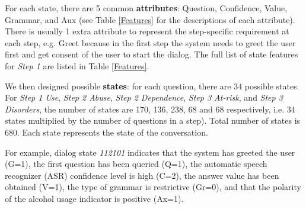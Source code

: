 \begin{sloppy}
For each state, there are 5 common {\bf attributes}: Question, Confidence, Value, Grammar, and Aux (see Table \ref{Features} for the descriptions of each attribute). There is usually 1 extra attribute to represent the step-specific requirement at each step, e.g. Greet because in the first step the system needs to greet the user first and get consent of the user to start the dialog. The full list of state features for {\em Step 1} are listed in Table \ref{Features}. 

We then designed possible {\bf states}: for each question, there are 34 possible states. 
For {\em Step 1 Use}, {\em Step 2 Abuse}, {\em Step 2 Dependence}, {\em Step 3 At-risk}, and {\em Step 3 Disorders}, the number of states are 170, 136, 238, 68 and 68 respectively, i.e. 34 states multiplied by the number of questions in a step). Total number of states is 680.
Each state represents the state of the conversation. 

For example, dialog state \textit{112101} indicates that the system has greeted the user (G=1), the first question has been queried (Q=1), the automatic speech recognizer (ASR) confidence level is high (C=2), the answer value has been obtained (V=1), the type of grammar is restrictive (Gr=0), and that the polarity of the alcohol usage indicator is positive (Ax=1). 

\onecolumn


\end{sloppy}
